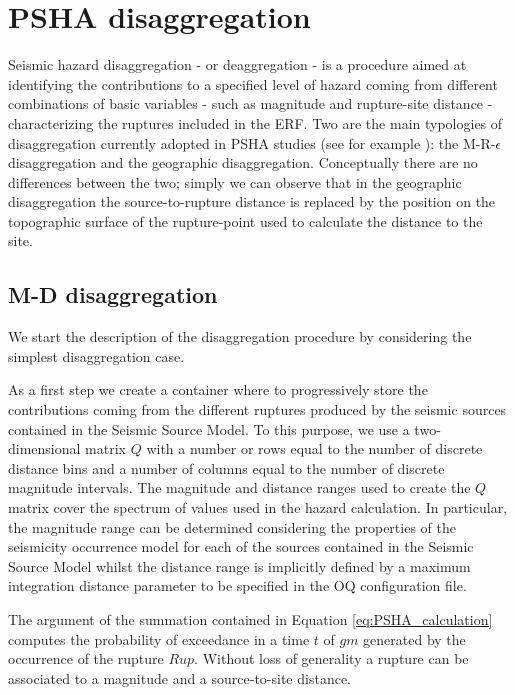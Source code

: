 \section{PSHA disaggregation}
\label{chap:disaggregation}
%
Seismic hazard disaggregation - or deaggregation - \citep{mcguire1995,bazzurro1999} is a procedure aimed at identifying the contributions to a specified level of hazard coming from different combinations
of basic variables - such as magnitude and rupture-site distance - characterizing the ruptures included in the ERF.
%
Two are the main typologies of disaggregation currently adopted in PSHA studies (see for example \citet{petersen2008}): the M-R-$\epsilon$ disaggregation and the geographic disaggregation. Conceptually there are no differences between the two; simply we can observe that in the geographic disaggregation the source-to-rupture distance is replaced by the position on the topographic surface of the rupture-point used to calculate the distance to the site.
%

\subsection{M-D disaggregation}
We start the description of the disaggregation procedure by considering the  simplest disaggregation case. 

As a first step we create a container where to progressively store the contributions coming from the different ruptures produced by the seismic sources contained in the Seismic Source Model.
%
To this purpose, we use a two-dimensional matrix $Q$ with a number or rows equal to the number of discrete distance bins and a number of columns equal to the number of discrete magnitude intervals. The magnitude and distance ranges used to create the $Q$ matrix cover the spectrum of values used in the hazard calculation. In particular, the magnitude range can be determined considering the properties of the seismicity occurrence model for each of the sources contained in the Seismic Source Model whilst the distance range is implicitly defined by a maximum integration distance parameter to be specified in the OQ configuration file. 
%

The argument of the summation contained in Equation \ref{eq:PSHA_calculation} computes the probability of exceedance in a time $t$ of $gm$ generated by the occurrence of the rupture $Rup$. Without loss of generality a rupture can be associated to a magnitude and a source-to-site distance.



